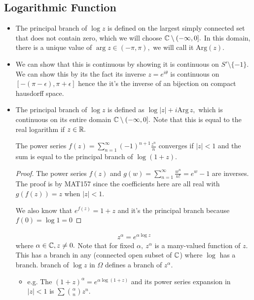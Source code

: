 \documentclass[a4paper,12pt]{article}
\begin{document}
\subsection{Logarithmic Function}
\begin{itemize}
    \item The principal branch of $\log z$ is defined on the largest simply connected set that does not contain zero, which we will choose $\mathbb{C}\setminus(-\infty,0].$ In this domain, there is a unique value of $\arg z\in(-\pi,\pi),$ we will call it $\mathrm{Arg}(z).$
    \item We can show that this is continuous by showing it is continuous on $S'\setminus\{-1\}.$ We can show this by its the fact its inverse $z=e^{i\theta}$ is continuous on $[-(\pi-\epsilon),\pi+\epsilon]$ hence the it's the inverse of an bijection on compact hausdorff space.
    \item The principal branch of $\log z$ is defined as $\log|z|+i\mathrm{Arg}\,z,$ which is continuous on its entire domain $\mathbb{C}\setminus(-\infty,0].$ Note that this is equal to the real logarithm if $z\in\mathbb{R}.$
    \begin{proposition}
        The power series $f(z)=\sum_{n=1}^\infty(-1)^{n+1}\frac{z^n}{n}$ converges if $|z|<1$ and the sum is equal to the principal branch of $\log(1+z).$ \begin{proof}
            The power series $f(z)$ and $g(w)=\sum_{n=1}^\infty\frac{w^n}{n!}=e^w-1$ are inverses. The proof is by MAT157 since the coefficients here are all real with $g(f(z))=z$ when $|z|<1$.

            We also know that $e^{f(z)}=1+z$ and it's the principal branch because $f(0)=\log 1=0$
        \end{proof}
    \end{proposition}
    \begin{definition}[Power]
        \begin{align}
            z^\alpha=e^{\alpha\log z}
        \end{align}
        where $\alpha\in\mathbb{C},z\neq0.$ Note that for fixed $\alpha,\: z^\alpha$ is a many-valued function of $z.$ This has a branch in any  (connected open subset of $\mathbb{C}$) where $\log$ has a branch.  branch of $\log z$ in $\Omega$ defines a branch of $z^\alpha.$
    \end{definition}
    \begin{itemize}
        \item e.g. The  $(1+z)^\alpha=e^{\alpha\log(1+z)}$ and its power series expansion in $|z|<1$ is $\sum\binom{\alpha}{n}z^n.$
    \end{itemize}
\end{itemize}
\end{document}
